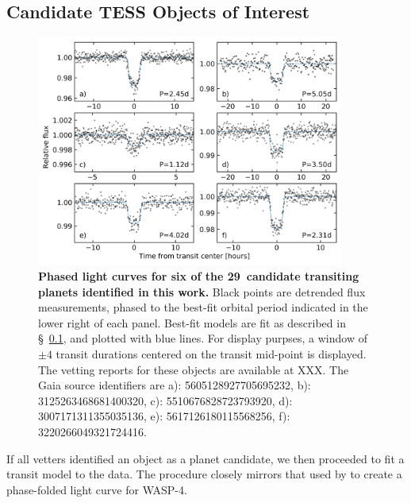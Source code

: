 \documentclass[12pt,twocolumn,tighten]{aastex62}
\newcommand{\numberpcs}{29\ }  %
\begin{document}
\subsection{Candidate TESS Objects of Interest}
\label{subsec:ctois}

\begin{figure}[t]
	\begin{center}
		\leavevmode
		\includegraphics[width=0.9\textwidth]{quilt_PCs.png}
	\end{center}
	\vspace{-0.2cm}
	\caption{
    {\bf Phased light curves for six of the \numberpcs candidate
    transiting planets identified in this work.}
    Black points are detrended flux measurements, phased to the
    best-fit orbital period indicated in the lower right of each
    panel.
    Best-fit models are fit as described in \S~\ref{subsec:ctois}, and
    plotted with blue lines.
    For display purpses, a window of $\pm 4$ transit durations
    centered on the transit mid-point is displayed.
    The vetting reports for these objects are available at XXX.	%
    The Gaia source identifiers are
    a): 5605128927705695232, 
    b): 3125263468681400320, 
    c): 5510676828723793920, 
    d): 3007171311355035136, 
    e): 5617126180115568256, 
    f): 3220266049321724416.   
	\label{fig:ctoi_quilt}
	}
\end{figure}

If all vetters identified an object as a planet candidate, we then
proceeded to fit a transit model to the data.  The procedure closely
mirrors that used by \citet{bouma_wasp-4b_2019} to create a
phase-folded light curve for WASP-4.
\end{document}
